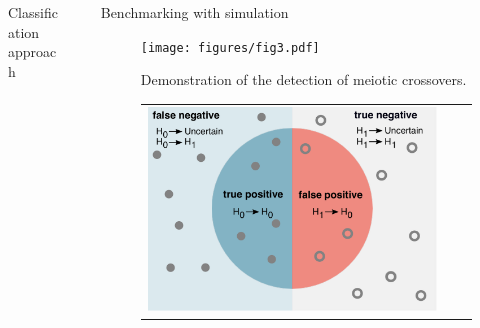 \documentclass[final]{beamer}
\newlength{\sepwidth}
\newlength{\colwidth}
\newcommand{\separatorcolumn}{\begin{column}{\sepwidth}\end{column}}
\begin{document}
\begin{frame}[t]
\begin{columns}[t]
\begin{column}{\colwidth}
\begin{block}{Classification approach}
  \end{block}
  
\end{column}

\separatorcolumn


\begin{column}{\colwidth}

\begin{block}{Benchmarking with simulation}
\begin{figure}

  \texttt{[image: figures/fig3.pdf]}
\caption{Demonstration of the detection of meiotic crossovers.}
 \end{figure}

\begin{figure}
\centering
\begin{tabular}{ccc}

  \includegraphics[width=0.27\linewidth,align=c]{figures/fig4a.pdf} &


\end{tabular}
\end{figure}
\end{block}
\end{column}
\end{columns}
\end{frame}
\end{document}
